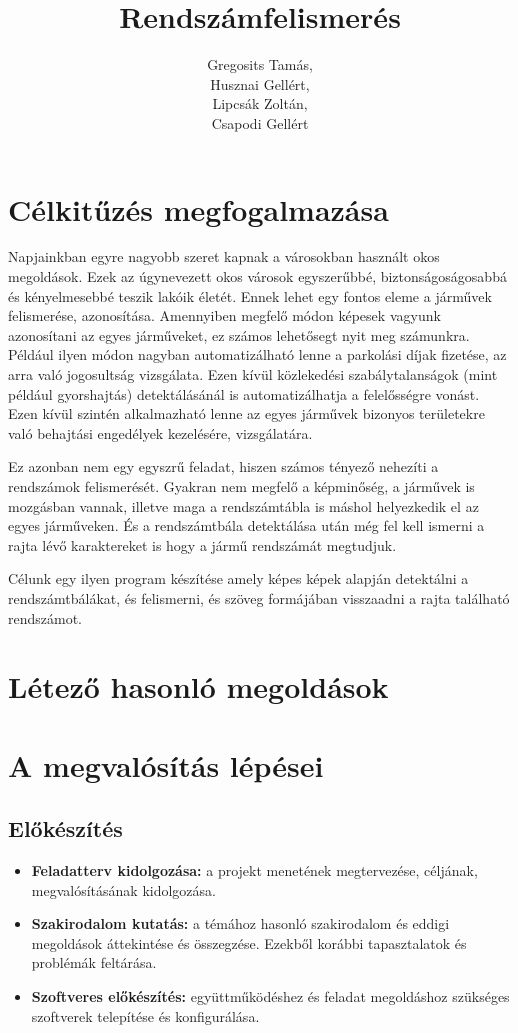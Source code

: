 \documentclass[12pt,a4paper]{article}
\author{Gregosits Tamás,\\Husznai Gellért,\\Lipcsák Zoltán,\\Csapodi Gellért}
\title{Rendszámfelismerés}
\begin{document}
\maketitle
\newpage
    \section{Célkitűzés megfogalmazása}
    Napjainkban egyre nagyobb szeret kapnak a városokban használt okos megoldások.
    Ezek az úgynevezett okos városok egyszerűbbé, biztonságoságosabbá és kényelmesebbé teszik lakóik életét.
    Ennek lehet egy fontos eleme a járművek felismerése, azonosítása. 
    Amennyiben megfelő módon képesek vagyunk azonosítani az egyes járműveket, ez számos lehetősegt nyit meg számunkra.
    Például ilyen módon nagyban automatizálható lenne a parkolási díjak fizetése, 
    az arra való jogosultság vizsgálata. Ezen kívül közlekedési szabálytalanságok (mint például gyorshajtás)
    detektálásánál is automatizálhatja a felelősségre vonást. Ezen kívül szintén alkalmazható
    lenne az egyes járművek bizonyos területekre való behajtási engedélyek kezelésére, vizsgálatára.

    Ez azonban nem egy egyszrű feladat, hiszen számos tényező nehezíti a rendszámok felismerését.
    Gyakran nem megfelő a képminőség, a járművek is mozgásban vannak, illetve maga a rendszámtábla is 
    máshol helyezkedik el az egyes járműveken. És a rendszámtbála detektálása után még fel kell 
    ismerni a rajta lévő karaktereket is hogy a jármű rendszámát megtudjuk.

    Célunk egy ilyen program készítése amely képes képek alapján detektálni a rendszámtbálákat,
    és felismerni, és szöveg formájában visszaadni a rajta található rendszámot.
    \section{Létező hasonló megoldások}
    \section{A megvalósítás lépései}
    \subsection{Előkészítés}
    \begin{itemize}
        \item \textbf{Feladatterv kidolgozása:} a projekt menetének megtervezése, céljának, megvalósításának kidolgozása.
        \item \textbf{Szakirodalom kutatás:} a témához hasonló szakirodalom és eddigi megoldások áttekintése és összegzése. Ezekből korábbi tapasztalatok és problémák feltárása.
        \item \textbf{Szoftveres előkészítés:} együttműködéshez és feladat megoldáshoz szükséges szoftverek telepítése és konfigurálása.
    \end{itemize}
    
\end{document}
